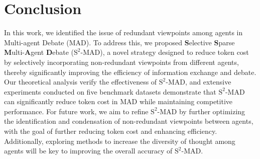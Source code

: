 \section{Conclusion}
\label{sec:conclusion}
In this work, we identified the issue of redundant viewpoints among agents in Multi-agent Debate (MAD). To address this, we proposed \textbf{S}elective \textbf{S}parse \textbf{M}ulti-\textbf{A}gent \textbf{D}ebate (\({\text{S}^2\text{-MAD}}\)), a novel strategy designed to reduce token cost by selectively incorporating non-redundant viewpoints from different agents, thereby significantly improving the efficiency of information exchange and debate.
Our theoretical analysis verify the effectiveness of $\text{S}^2\text{-MAD}$, and extensive experiments conducted on five benchmark datasets demonstrate that $\text{S}^2\text{-MAD}$ can significantly reduce token cost in MAD while maintaining competitive performance.
For future work, we aim to refine $\text{S}^2\text{-MAD}$ by further optimizing the identification and condensation of non-redundant viewpoints between agents, with the goal of further reducing token cost and enhancing efficiency. Additionally, exploring methods to increase the diversity of thought among agents will be key to improving the overall accuracy of $\text{S}^2\text{-MAD}$.